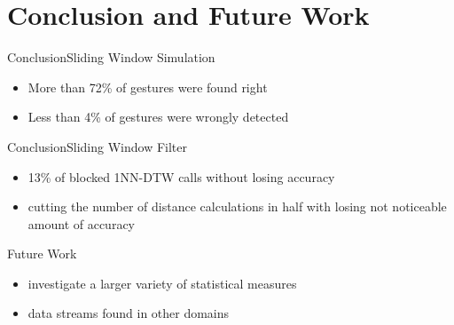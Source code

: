 \section{Conclusion and Future Work}

\begin{frame}{Conclusion}{Sliding Window Simulation}
    \begin{itemize}
        \item More than 72\% of gestures were found right

        \item Less than 4\% of gestures were wrongly detected
    \end{itemize}
\end{frame}

\begin{frame}{Conclusion}{Sliding Window Filter}
    \begin{itemize}
        \item 13\% of blocked 1NN-DTW calls without losing accuracy

        \item cutting the number of distance calculations in half with losing not noticeable amount of accuracy
    \end{itemize}
\end{frame}

\begin{frame}{Future Work}
    \begin{itemize}
        \item investigate a larger variety of statistical measures

        \item data streams found in other domains
    \end{itemize}
\end{frame}
